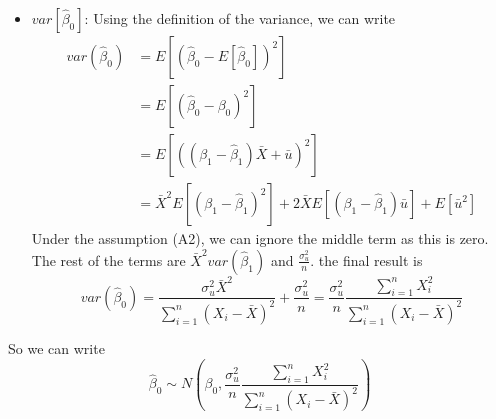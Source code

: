 \documentclass[12pt]{article}
\theoremstyle{definition}
\theoremstyle{property}
\theoremstyle{assumption}
\theoremstyle{example}
\theoremstyle{comment}
\begin{document}
\begin{itemize}
\begin{itemize}
\item $var[\hat{\beta}_0]$: Using the definition of the variance, we can write \[
\begin{aligned}
var(\hat{\beta}_0)&=E\left[\left(\hat{\beta}_0-E[\hat{\beta}_0]\right)^2\right] \\
&=E\left[\left(\hat{\beta}_0-{\beta}_0\right)^2\right]\\
&=E\left[\left( (\beta_1-\hat{\beta}_1)\bar{X}+\bar{u}\right)^2\right]\\
&=\bar{X}^2E\left[\left(\beta_1-\hat{\beta}_1 \right)^2\right]+ 2\bar{X}E\left[\left(\beta_1-\hat{\beta}_1 \right)\bar{u}\right] + E[\bar{u}^2]
\end{aligned}
\]
Under the assumption (A2), we can ignore the middle term as this is zero. The rest of the terms are $\bar{X}^2 var(\hat{\beta}_1)$ and $\frac{\sigma_u^2}{n}$. the final result is
\[
var(\hat{\beta}_0)=\frac{\sigma_u^2\bar{X}^2}{\sum_{i=1}^n(X_i-\bar{X})^2}+\frac{\sigma_u^2}{n}= \frac{\sigma_u^2}{n}\frac{\sum_{i=1}^nX_i^2}{\sum_{i=1}^n(X_i-\bar{X})^2}
\]
\end{itemize}
So we can write 
\[
\hat{\beta}_0 \sim N\left(\beta_0, \frac{\sigma_u^2}{n}\frac{\sum_{i=1}^nX_i^2}{\sum_{i=1}^n(X_i-\bar{X})^2}\right)
\]
\end{itemize}
\end{document}
